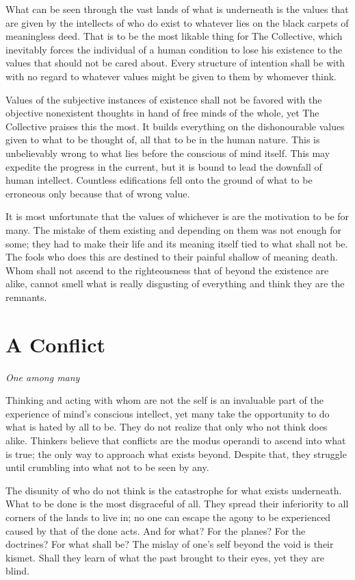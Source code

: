 \documentclass[twoside]{book}
\begin{document}
What can be seen through the vast lands of what is underneath is the values that
are given by the intellects of who do exist to whatever lies on the black
carpets of meaningless deed. That is to be the most likable thing for The
Collective, which inevitably forces the individual of a human condition to lose
his existence to the values that should not be cared about. Every structure of
intention shall be with with no regard to whatever values might be given to them
by whomever think.

Values of the subjective instances of existence shall not be favored with the
objective nonexistent thoughts in hand of free minds of the whole, yet The
Collective praises this the most. It builds everything on the dishonourable
values given to what to be thought of, all that to be in the human nature. This
is unbelievably wrong to what lies before the conscious of mind itself. This may
expedite the progress in the current, but it is bound to lead the downfall of
human intellect. Countless edifications fell onto the ground of what to be
erroneous only because that of wrong value.

It is most unfortunate that the values of whichever is are the motivation to be
for many. The mistake of them existing and depending on them was not enough for
some; they had to make their life and its meaning itself tied to what shall not
be. The fools who does this are destined to their painful shallow of meaning
death. Whom shall not ascend to the righteousness that of beyond the existence
are alike, cannot smell what is really disgusting of everything and think they
are the remnants.

\section{A Conflict}
\textit{One among many}

Thinking and acting with whom are not the self is an invaluable part of the
experience of mind's conscious intellect, yet many take the opportunity to do
what is hated by all to be. They do not realize that only who not think does
alike. Thinkers believe that conflicts are the modus operandi to ascend into
what is true; the only way to approach what exists beyond. Despite that, they
struggle until crumbling into what not to be seen by any.

The disunity of who do not think is the catastrophe for what exists underneath.
What to be done is the most disgraceful of all. They spread their inferiority to
all corners of the lands to live in; no one can escape the agony to be
experienced caused by that of the done acts. And for what? For the planes? For
the doctrines? For what shall be? The mislay of one's self beyond the void is
their kismet. Shall they learn of what the past brought to their eyes, yet they
are blind.
\end{document}
